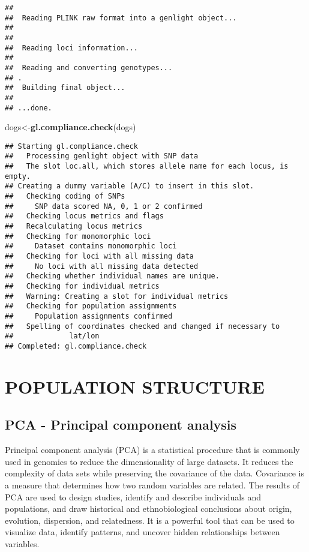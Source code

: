 \documentclass[
]{article}
\newenvironment{Shaded}{\begin{snugshade}}{\end{snugshade}}
\newcommand{\FunctionTok}[1]{\textcolor[rgb]{0.13,0.29,0.53}{\textbf{#1}}}
\newcommand{\NormalTok}[1]{#1}
\newcommand{\OtherTok}[1]{\textcolor[rgb]{0.56,0.35,0.01}{#1}}
\begin{document}
\begin{verbatim}
## 
##  Reading PLINK raw format into a genlight object... 
## 
## 
##  Reading loci information... 
## 
##  Reading and converting genotypes... 
## .
##  Building final object... 
## 
## ...done.
\end{verbatim}

\begin{Shaded}
\begin{Highlighting}[]
\NormalTok{dogs}\OtherTok{\textless{}{-}}\FunctionTok{gl.compliance.check}\NormalTok{(dogs)}
\end{Highlighting}
\end{Shaded}

\begin{verbatim}
## Starting gl.compliance.check 
##   Processing genlight object with SNP data
##   The slot loc.all, which stores allele name for each locus, is empty. 
## Creating a dummy variable (A/C) to insert in this slot. 
##   Checking coding of SNPs
##     SNP data scored NA, 0, 1 or 2 confirmed
##   Checking locus metrics and flags
##   Recalculating locus metrics
##   Checking for monomorphic loci
##     Dataset contains monomorphic loci
##   Checking for loci with all missing data
##     No loci with all missing data detected
##   Checking whether individual names are unique.
##   Checking for individual metrics
##   Warning: Creating a slot for individual metrics
##   Checking for population assignments
##     Population assignments confirmed
##   Spelling of coordinates checked and changed if necessary to 
##             lat/lon
## Completed: gl.compliance.check
\end{verbatim}

\section{POPULATION STRUCTURE}\label{population-structure}

\subsection{PCA - Principal component
analysis}\label{pca---principal-component-analysis}

Principal component analysis (PCA) is a statistical procedure that is
commonly used in genomics to reduce the dimensionality of large
datasets. It reduces the complexity of data sets while preserving the
covariance of the data. Covariance is a measure that determines how two
random variables are related. The results of PCA are used to design
studies, identify and describe individuals and populations, and draw
historical and ethnobiological conclusions about origin, evolution,
dispersion, and relatedness. It is a powerful tool that can be used to
visualize data, identify patterns, and uncover hidden relationships
between variables.
\end{document}

